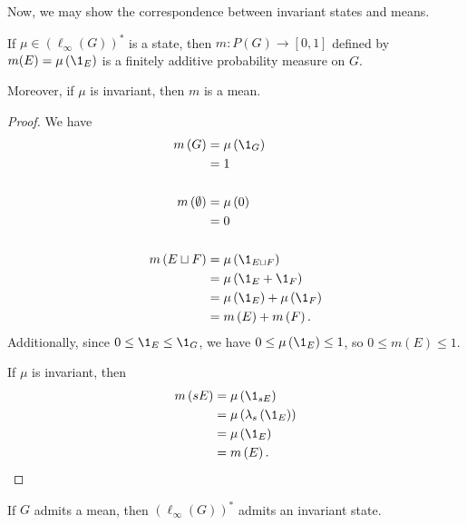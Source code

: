 Now, we may show the correspondence between invariant states and means.
\begin{proposition}
  If $\mu\in \left(\ell_{\infty}\left(G\right)\right)^{\ast}$ is a state, then $m\colon P(G)\rightarrow [0,1]$ defined by $m(E) = \mu\left(\1_{E}\right)$ is a finitely additive probability measure on $G$.\newline

  Moreover, if $\mu$ is invariant, then $m$ is a mean.\label{prop:state_implies_mean}
\end{proposition}
\begin{proof}
  We have
  \begin{align*}
    m\left(G\right) &= \mu\left(\1_{G}\right)\\
                    &= 1\\
                    \\
    m\left(\emptyset\right) &= \mu\left(0\right)\\
                            &= 0\\
                            \\
    m\left(E\sqcup F\right) &= \mu\left(\1_{E\sqcup F}\right)\\
                            &= \mu\left(\1_{E} + \1_{F}\right)\\
                            &= \mu\left(\1_{E}\right) + \mu\left(\1_{F}\right)\\
                            &= m\left(E\right) + m\left(F\right).
  \end{align*}
  Additionally, since $0 \leq \1_{E}\leq \1_{G}$, we have $0 \leq \mu\left(\1_{E}\right) \leq 1$, so $0 \leq m(E) \leq 1$.\newline

  If $\mu$ is invariant, then
  \begin{align*}
    m\left(sE\right) &= \mu\left(\1_{sE}\right)\\
                     &= \mu\left(\lambda_s\left(\1_{E}\right)\right)\\
                     &= \mu\left(\1_{E}\right)\\
                     &= m\left(E\right).
  \end{align*}
\end{proof}
\begin{proposition}
  If $G$ admits a mean, then $\left(\ell_{\infty}\left(G\right)\right)^{\ast}$ admits an invariant state.\label{prop:mean_implies_state}
\end{proposition}
